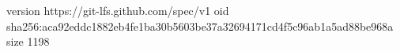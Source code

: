 version https://git-lfs.github.com/spec/v1
oid sha256:aca92eddc1882eb4fe1ba30b5603be37a32694171cd4f5c96ab1a5ad88be968a
size 1198
